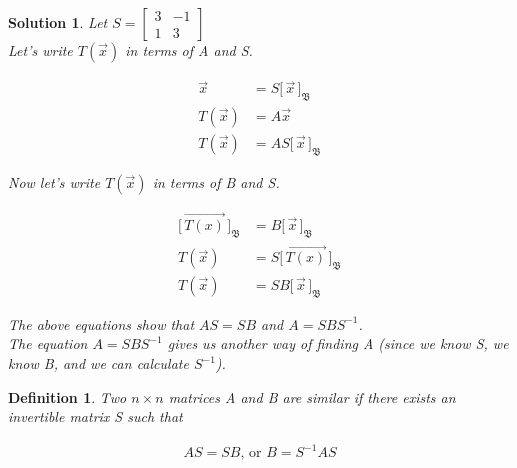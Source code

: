 \documentclass{article}
\newtheorem{definition}{Definition}
\newtheorem*{solution}{Solution}
\newcommand{\Coord}[2]{\Bigg[ \, \vec{#1} \, \Bigg]_{\mathfrak{#2}}}
\begin{document}
\begin{solution}
Let $S = \begin{bmatrix} 3 & -1 \\ 1 & 3 \end{bmatrix}$ \\

Let's write $T(\vec{x})$ in terms of A and S.

\begin{align*}
\vec{x} &= S \Coord{x}{B} \\
T(\vec{x}) &= A \vec{x} \\
T(\vec{x}) &= A S \Coord{x}{B} 
\end{align*}

Now let's write $T(\vec{x})$ in terms of B and S.

\begin{align*}
\Coord{T(x)}{B} &= B\Coord{x}{B} \\
T(\vec{x}) &= S \Coord{T(x)}{B}  \\
T(\vec{x}) &= S B\Coord{x}{B}
\end{align*}

The above equations show that $AS = SB$ and $A = SBS^{-1}$. \\

The equation $A = SBS^{-1}$ gives us another way of finding A (since we know S, we know B, and we can calculate $S^{-1}$).

\end{solution}

\begin{definition}
Two $n \times n$ matrices A and B are similar if there exists an invertible matrix S such that

\begin{align*}
AS = SB\textrm{, or }B = S^{-1}AS
\end{align*}

\end{definition}
\end{document}
